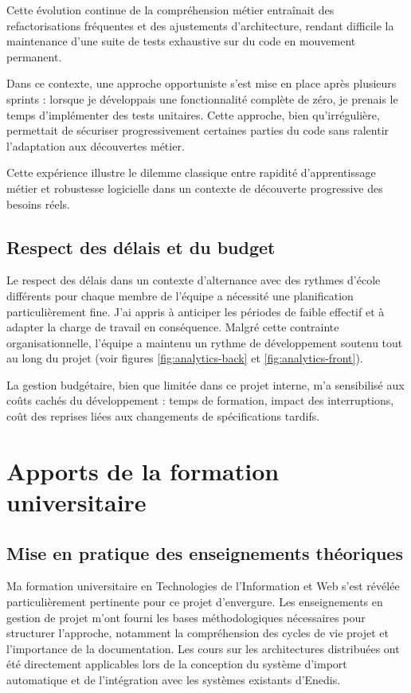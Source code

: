 Cette évolution continue de la compréhension métier entraînait des refactorisations fréquentes et des ajustements d'architecture, rendant difficile la maintenance d'une suite de tests exhaustive sur du code en mouvement permanent.

Dans ce contexte, une approche opportuniste s'est mise en place après plusieurs sprints : lorsque je développais une fonctionnalité complète de zéro, je prenais le temps d'implémenter des tests unitaires. Cette approche, bien qu'irrégulière, permettait de sécuriser progressivement certaines parties du code sans ralentir l'adaptation aux découvertes métier.

Cette expérience illustre le dilemme classique entre rapidité d'apprentissage métier et robustesse logicielle dans un contexte de découverte progressive des besoins réels.

\subsection{Respect des délais et du budget}
Le respect des délais dans un contexte d'alternance avec des rythmes d'école différents pour chaque membre de l'équipe a nécessité une planification particulièrement fine.
J'ai appris à anticiper les périodes de faible effectif et à adapter la charge de travail en conséquence. Malgré cette contrainte organisationnelle, l'équipe a maintenu un rythme de développement soutenu tout au long du projet (voir figures \ref{fig:analytics-back} et \ref{fig:analytics-front}).

La gestion budgétaire, bien que limitée dans ce projet interne, m'a sensibilisé aux coûts cachés du développement : temps de formation, impact des interruptions, coût des reprises liées aux changements de spécifications tardifs.


\section{Apports de la formation universitaire}

\subsection{Mise en pratique des enseignements théoriques}

Ma formation universitaire en Technologies de l'Information et Web s'est révélée particulièrement pertinente pour ce projet d'envergure.
Les enseignements en gestion de projet m'ont fourni les bases méthodologiques nécessaires pour structurer l'approche, notamment la compréhension des cycles de vie projet et l'importance de la documentation.
Les cours sur les architectures distribuées ont été directement applicables lors de la conception du système d'import automatique et de l'intégration avec les systèmes existants d'Enedis.

